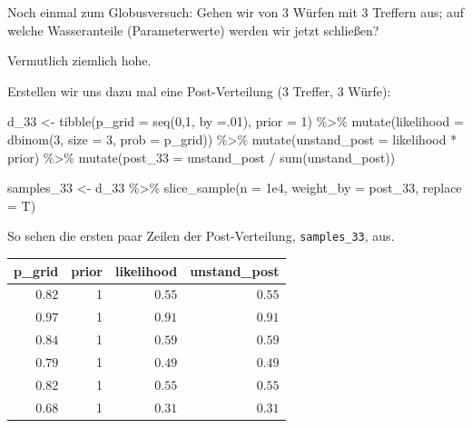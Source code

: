 \documentclass[
  a4paper,
  DIV=11]{scrreprt}
\newenvironment{Shaded}{\begin{snugshade}}{\end{snugshade}}
\newcommand{\AttributeTok}[1]{\textcolor[rgb]{0.40,0.45,0.13}{#1}}
\newcommand{\DecValTok}[1]{\textcolor[rgb]{0.68,0.00,0.00}{#1}}
\newcommand{\FloatTok}[1]{\textcolor[rgb]{0.68,0.00,0.00}{#1}}
\newcommand{\FunctionTok}[1]{\textcolor[rgb]{0.28,0.35,0.67}{#1}}
\newcommand{\NormalTok}[1]{\textcolor[rgb]{0.00,0.23,0.31}{#1}}
\newcommand{\OtherTok}[1]{\textcolor[rgb]{0.00,0.23,0.31}{#1}}
\newcommand{\SpecialCharTok}[1]{\textcolor[rgb]{0.37,0.37,0.37}{#1}}
\theoremstyle{definition}
\theoremstyle{remark}
\begin{document}
Noch einmal zum Globusversuch: Gehen wir von 3 Würfen mit 3 Treffern
aus; auf welche Wasseranteile (Parameterwerte) werden wir jetzt
schließen?

Vermutlich ziemlich hohe.

Erstellen wir uns dazu mal eine Post-Verteilung (3 Treffer, 3 Würfe):

\begin{Shaded}
\begin{Highlighting}[]
\NormalTok{d\_33 }\OtherTok{\textless{}{-}} 
  \FunctionTok{tibble}\NormalTok{(}\AttributeTok{p\_grid =} \FunctionTok{seq}\NormalTok{(}\DecValTok{0}\NormalTok{,}\DecValTok{1}\NormalTok{, }\AttributeTok{by =}\NormalTok{.}\DecValTok{01}\NormalTok{),}
         \AttributeTok{prior =} \DecValTok{1}\NormalTok{) }\SpecialCharTok{\%\textgreater{}\%} 
  \FunctionTok{mutate}\NormalTok{(}\AttributeTok{likelihood =} \FunctionTok{dbinom}\NormalTok{(}\DecValTok{3}\NormalTok{, }\AttributeTok{size =} \DecValTok{3}\NormalTok{, }\AttributeTok{prob =}\NormalTok{ p\_grid)) }\SpecialCharTok{\%\textgreater{}\%} 
  \FunctionTok{mutate}\NormalTok{(}\AttributeTok{unstand\_post =}\NormalTok{ likelihood }\SpecialCharTok{*}\NormalTok{ prior) }\SpecialCharTok{\%\textgreater{}\%} 
  \FunctionTok{mutate}\NormalTok{(}\AttributeTok{post\_33  =}\NormalTok{ unstand\_post }\SpecialCharTok{/} \FunctionTok{sum}\NormalTok{(unstand\_post)) }

\NormalTok{samples\_33 }\OtherTok{\textless{}{-}} 
\NormalTok{  d\_33 }\SpecialCharTok{\%\textgreater{}\%} 
    \FunctionTok{slice\_sample}\NormalTok{(}\AttributeTok{n =} \FloatTok{1e4}\NormalTok{, }
                 \AttributeTok{weight\_by =}\NormalTok{ post\_33, }
                 \AttributeTok{replace =}\NormalTok{ T)}
\end{Highlighting}
\end{Shaded}

So sehen die ersten paar Zeilen der Post-Verteilung,
\texttt{samples\_33}, aus.

\begin{longtable}{rrrr}
\toprule
p\_grid & prior & likelihood & unstand\_post \\ 
\midrule
$0.82$ & 1 & $0.55$ & $0.55$ \\ 
$0.97$ & 1 & $0.91$ & $0.91$ \\ 
$0.84$ & 1 & $0.59$ & $0.59$ \\ 
$0.79$ & 1 & $0.49$ & $0.49$ \\ 
$0.82$ & 1 & $0.55$ & $0.55$ \\ 
$0.68$ & 1 & $0.31$ & $0.31$ \\ 
\bottomrule
\end{longtable}
\end{document}
